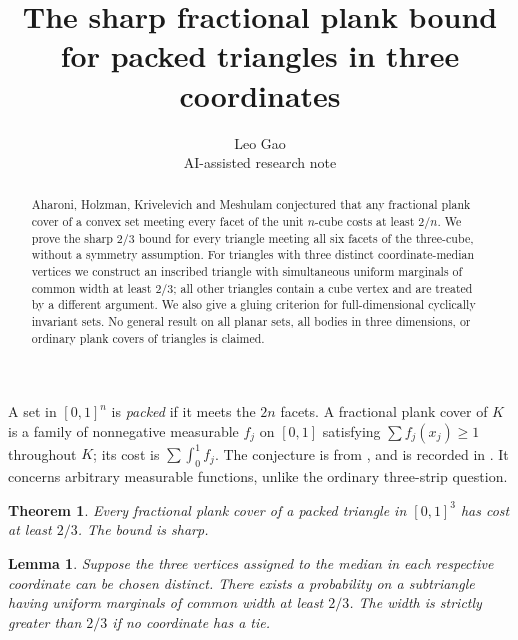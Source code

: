 \documentclass[11pt]{article}
\title{The sharp fractional plank bound for packed triangles in three coordinates}
\author{Leo Gao\\\small AI-assisted research note}\date{}
\newtheorem{theorem}{Theorem}\newtheorem{lemma}{Lemma}\newtheorem{corollary}{Corollary}
\begin{document}
\maketitle
\begin{abstract}
Aharoni, Holzman, Krivelevich and Meshulam conjectured that any fractional plank cover of a convex set meeting every facet of the unit $n$-cube costs at least $2/n$. We prove the sharp $2/3$ bound for every triangle meeting all six facets of the three-cube, without a symmetry assumption. For triangles with three distinct coordinate-median vertices we construct an inscribed triangle with simultaneous uniform marginals of common width at least $2/3$; all other triangles contain a cube vertex and are treated by a different argument. We also give a gluing criterion for full-dimensional cyclically invariant sets. No general result on all planar sets, all bodies in three dimensions, or ordinary plank covers of triangles is claimed.
\end{abstract}
A set in $[0,1]^n$ is \emph{packed} if it meets the $2n$ facets. A fractional plank cover of $K$ is a family of nonnegative measurable $f_j$ on $[0,1]$ satisfying $\sum f_j(x_j)\ge1$ throughout $K$; its cost is $\sum\int_0^1 f_j$. The conjecture is from \cite[Conj.~3.4]{AHKM}, and is recorded in \cite[Sec.~3.4]{BMP}. It concerns arbitrary measurable functions, unlike the ordinary three-strip question.
\begin{theorem}\label{main} Every fractional plank cover of a packed triangle in $[0,1]^3$ has cost at least $2/3$. The bound is sharp.\end{theorem}
\begin{lemma}\label{distinct} Suppose the three vertices assigned to the median in each respective coordinate can be chosen distinct. There exists a probability on a subtriangle having uniform marginals of common width at least $2/3$. The width is strictly greater than $2/3$ if no coordinate has a tie.\end{lemma}
\end{document}
